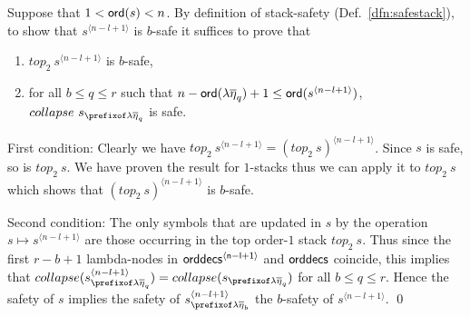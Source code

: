 \documentclass{article}
\theoremstyle{remark}
\theoremstyle{definition}
\newcommand\orddec{\sf orddec}
\begin{document}
Suppose that $1<{\sf ord}(s)<n$.
By definition of stack-safety (Def.~\ref{dfn:safestack}), to show that $s^{\langle n-l+1 \rangle}$ is $b$-safe it suffices to prove that
\begin{enumerate}
\item $top_2~s^{\langle n-l+1 \rangle}$ is $b$-safe,
\item for all $b\leq q \leq r$ such that
$n-{\sf ord}(\lambda \overline{\eta}_{q}) +1 \leq {\sf ord}(s^{\langle n-l+1 \rangle})$, $collapse~s_{\prefixof \lambda \overline{\eta}_{q}}$ is safe.
\end{enumerate}

First condition: Clearly we have $top_2~s^{\langle n-l+1 \rangle} = (top_2~s)^{\langle n-l+1 \rangle}$. Since $s$ is safe, so is $top_2~s$. We have proven the result for $1$-stacks thus we can apply it to $top_2~s$ which shows that $(top_2~s)^{\langle n-l+1 \rangle}$ is $b$-safe.

Second condition: The only symbols that are updated in $s$ by the operation $s \mapsto s^{\langle n-l+1 \rangle}$ are those occurring in the top order-$1$ stack $top_2~s$. Thus since the first $r-b+1$ lambda-nodes in $\orddec{s^{\langle n-l+1 \rangle}}$ and $\orddec{s}$ coincide, this implies that $collapse(s^{\langle n-l+1 \rangle}_{\prefixof\lambda\overline\eta_q}) = collapse(s_{\prefixof\lambda\overline\eta_q})$ for all $b \leq q \leq r$.
Hence the safety of $s$ implies the safety of $s^{\langle n-l+1 \rangle}_{\prefixof\lambda\overline\eta_b}$ \ie the $b$-safety of $s^{\langle n-l+1 \rangle}$.
\qed
\smallskip
\end{document}
